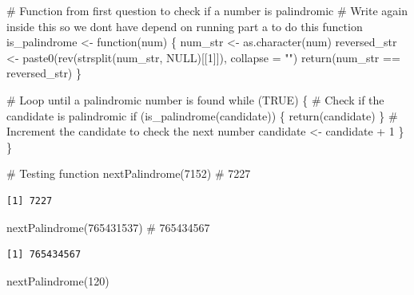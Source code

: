 \documentclass[
  letterpaper,
  DIV=11,
  numbers=noendperiod]{scrartcl}
\newenvironment{Shaded}{\begin{snugshade}}{\end{snugshade}}
\newcommand{\AttributeTok}[1]{\textcolor[rgb]{0.40,0.45,0.13}{#1}}
\newcommand{\CommentTok}[1]{\textcolor[rgb]{0.37,0.37,0.37}{#1}}
\newcommand{\ConstantTok}[1]{\textcolor[rgb]{0.56,0.35,0.01}{#1}}
\newcommand{\ControlFlowTok}[1]{\textcolor[rgb]{0.00,0.23,0.31}{#1}}
\newcommand{\DecValTok}[1]{\textcolor[rgb]{0.68,0.00,0.00}{#1}}
\newcommand{\FunctionTok}[1]{\textcolor[rgb]{0.28,0.35,0.67}{#1}}
\newcommand{\NormalTok}[1]{\textcolor[rgb]{0.00,0.23,0.31}{#1}}
\newcommand{\OtherTok}[1]{\textcolor[rgb]{0.00,0.23,0.31}{#1}}
\newcommand{\SpecialCharTok}[1]{\textcolor[rgb]{0.37,0.37,0.37}{#1}}
\newcommand{\StringTok}[1]{\textcolor[rgb]{0.13,0.47,0.30}{#1}}
\begin{document}
\begin{Shaded}
\begin{Highlighting}[]
  \CommentTok{\# Function from first question to check if a number is palindromic}
  \CommentTok{\# Write again inside this so we don\textquotesingle{}t have depend on running part a to do this function}
\NormalTok{  is\_palindrome }\OtherTok{\textless{}{-}} \ControlFlowTok{function}\NormalTok{(num) \{}
\NormalTok{    num\_str }\OtherTok{\textless{}{-}} \FunctionTok{as.character}\NormalTok{(num)}
\NormalTok{    reversed\_str }\OtherTok{\textless{}{-}} \FunctionTok{paste0}\NormalTok{(}\FunctionTok{rev}\NormalTok{(}\FunctionTok{strsplit}\NormalTok{(num\_str, }\ConstantTok{NULL}\NormalTok{)[[}\DecValTok{1}\NormalTok{]]), }\AttributeTok{collapse =} \StringTok{""}\NormalTok{)}
    \FunctionTok{return}\NormalTok{(num\_str }\SpecialCharTok{==}\NormalTok{ reversed\_str)}
\NormalTok{  \}}
  
  \CommentTok{\# Loop until a palindromic number is found}
  \ControlFlowTok{while}\NormalTok{ (}\ConstantTok{TRUE}\NormalTok{) \{}
    \CommentTok{\# Check if the candidate is palindromic}
    \ControlFlowTok{if}\NormalTok{ (}\FunctionTok{is\_palindrome}\NormalTok{(candidate)) \{}
      \FunctionTok{return}\NormalTok{(candidate)}
\NormalTok{    \}}
    \CommentTok{\# Increment the candidate to check the next number}
\NormalTok{    candidate }\OtherTok{\textless{}{-}}\NormalTok{ candidate }\SpecialCharTok{+} \DecValTok{1}
\NormalTok{  \}}
\NormalTok{\}}

\CommentTok{\# Testing function}
\FunctionTok{nextPalindrome}\NormalTok{(}\DecValTok{7152}\NormalTok{)  }\CommentTok{\# 7227}
\end{Highlighting}
\end{Shaded}

\begin{verbatim}
[1] 7227
\end{verbatim}

\begin{Shaded}
\begin{Highlighting}[]
\FunctionTok{nextPalindrome}\NormalTok{(}\DecValTok{765431537}\NormalTok{)  }\CommentTok{\# 765434567}
\end{Highlighting}
\end{Shaded}

\begin{verbatim}
[1] 765434567
\end{verbatim}

\begin{Shaded}
\begin{Highlighting}[]
\FunctionTok{nextPalindrome}\NormalTok{(}\DecValTok{120}\NormalTok{)}
\end{Highlighting}
\end{Shaded}
\end{document}
